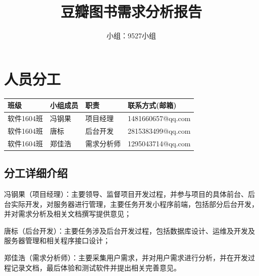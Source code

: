 \documentclass[a4paper,12pt]{ctexrep}
\title{豆瓣图书需求分析报告}
\author{小组：9527小组}
\begin{document}
	\maketitle
	\newpage
	\tableofcontents
	\thispagestyle{empty}
	\newpage
	\section{人员分工}
	\begin{center}
	\begin{tabular}{|p{3cm}<{\centering}|p{3cm}<{\centering}|p{3cm}<{\centering}|p{5cm}<{\centering}|}
		\hline
		班级&小组成员&职责&联系方式(邮箱)\\
		\hline
		软件1604班&冯钢果&项目经理&1481660657@qq.com\\
		\hline
		软件1604班&唐标&后台开发&2815383499@qq.com\\
		\hline
		软件1604班&郑佳浩&需求分析师&1295043714@qq.com\\
		\hline
	\end{tabular}
	\end{center}
	\subsection*{分工详细介绍}
	\par 冯钢果（项目经理）：主要领导、监督项目开发过程，并参与项目的具体前台、后台实际开发，对服务器进行管理，主要任务开发小程序前端，包括部分后台开发，并对需求分析及相关文档撰写提供意见；
	\par 唐标（后台开发）：主要任务涉及后台开发过程，包括数据库设计、运维及开发及服务器管理和相关程序接口设计；
	\par 郑佳浩（需求分析师）：主要采集用户需求，并对用户需求进行分析，并在开发过程记录文档，最后体验和测试软件并提出相关完善意见。
\end{document}
